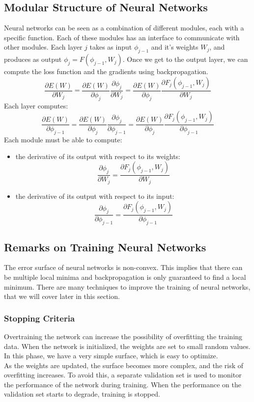 \subsection{Modular Structure of Neural Networks}
Neural networks can be seen as a combination of different modules, each with a specific function. Each of these modules has an interface to communicate with other modules.
Each layer $j$ takes as input  $\phi_{j-1}$ and it's weights $W_j$, and produces as output $\phi_{j} = F(\phi_{j-1}, W_j)$. Once we get to the output layer, we can compute the loss function and the gradients using backpropagation.
\[\frac{\partial E(W)}{\partial W_j} = \frac{\partial E(W)}{\partial \phi_j} \frac{\partial \phi_j}{\partial W_j}  = \frac{\partial E(W)}{\partial \phi_j} \frac{\partial F_j(\phi_{j-1}, W_j)}{\partial W_j}\]
Each layer computes:
\[ \frac{\partial E(W)}{\partial \phi_{j-1}} = \frac{\partial E(W)}{\partial \phi_j} \frac{\partial \phi_j}{\partial \phi_{j-1}} = \frac{\partial E(W)}{\partial \phi_j} \frac{\partial F_j(\phi_{j-1}, W_j)}{\partial \phi_{j-1}} \]
Each module must be able to compute:
\begin{itemize}
    \item the derivative of its output with respect to its weights:
    \[ \frac{\partial \phi_j}{\partial W_j} = \frac{\partial F_j(\phi_{j-1}, W_j)}{\partial W_j} \]
    \item the derivative of its output with respect to its input:
    \[ \frac{\partial \phi_j}{\partial \phi_{j-1}} = \frac{\partial F_j(\phi_{j-1}, W_j)}{\partial \phi_{j-1}} \]
\end{itemize}

\subsection{Remarks on Training Neural Networks}
The error surface of neural networks is non-convex. This implies that there can be multiple local minima and backpropagation is only guaranteed to find a local minimum.
There are many techniques to improve the training of neural networks, that we will cover later in this section.
\subsubsection{Stopping Criteria}
Overtraining the network can increase the possibility of overfitting the training data. When the network is initialized, the weights are set to small random values. In this phase, we have a very simple surface, which is easy to optimize.
\\As the weights are updated, the surface becomes more complex, and the risk of overfitting increases.
To avoid this, a separate validation set is used to monitor the performance of the network during training. When the performance on the validation set starts to degrade, training is stopped.
